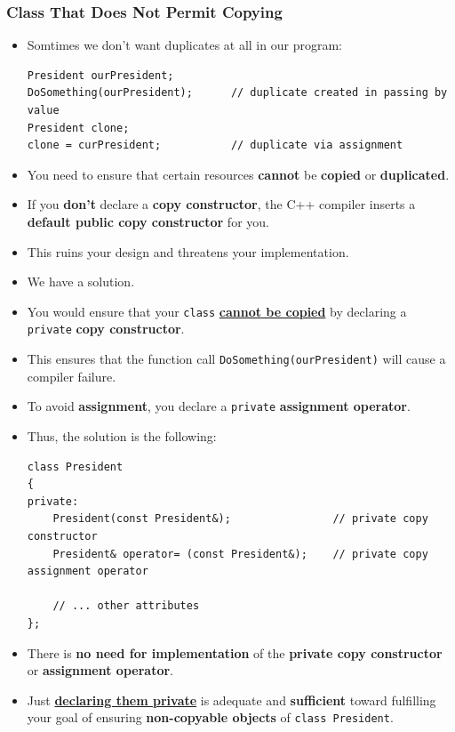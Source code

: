 \documentclass[10pt]{article}
\newcommand{\pbreak}{\vspace{30pt}}
\begin{document}
\subsubsection{Class That Does Not Permit Copying}
\begin{itemize}
	\item Somtimes we don't want duplicates at all in our program:
	\begin{verbatim}
President ourPresident;
DoSomething(ourPresident);		// duplicate created in passing by value
President clone;
clone = curPresident;			// duplicate via assignment
	\end{verbatim}
\item You need to ensure that certain resources \textbf{cannot} be \textbf{copied} or \textbf{duplicated}.

\item If you \textbf{don't} declare a \textbf{copy constructor}, the C++ compiler inserts a \textbf{default public copy constructor} for you.

\item This ruins your design and threatens your implementation.

\item We have a solution.

\item You would ensure that your \verb|class| \textbf{\underline{cannot be copied}} by declaring a \verb|private| \textbf{copy constructor}.

\item This ensures that the function call \verb|DoSomething(ourPresident)| will cause a compiler failure.

\item To avoid \textbf{assignment}, you declare a \verb|private| \textbf{assignment operator}.

	\pbreak

\item Thus, the solution is the following:

	\begin{verbatim}
class President
{
private:
	President(const President&);				// private copy constructor
	President& operator= (const President&);	// private copy assignment operator

	// ... other attributes
};
	\end{verbatim}

\item There is \textbf{no need for implementation} of the \textbf{private copy constructor} or \textbf{assignment operator}.

\item Just \underline{\textbf{declaring them private}} is adequate and \textbf{sufficient} toward fulfilling your goal of ensuring \textbf{non-copyable objects} of \verb|class President|.
\end{itemize}
\end{document}
